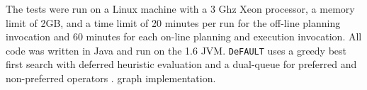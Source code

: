 \documentclass{article}
\def\citep#1{\cite{#1}} \def\citet#1{\citeA{#1}}
\def\und#1{\noindent{\bf #1}:}
\def\FFRISKY{{\tt DeFAULT}}
\def\und#1{\medskip{\noindent\bf #1:}}
\begin{document}
%
%
%
%
%


\und{Test Setup} The tests were run on a Linux machine with a 3 Ghz Xeon
processor, a memory limit of 2GB, and a time limit of 20 minutes per run for the
off-line planning invocation and 60 minutes for each on-line planning and
execution invocation.  All code was written in Java and run on the 1.6 JVM. 
\FFRISKY{} uses a greedy best first search with deferred heuristic evaluation
and a dual-queue for preferred and non-preferred operators
\citep{DBLP:journals/jair/Helmert06}.  %
graph implementation.


\end{document}
